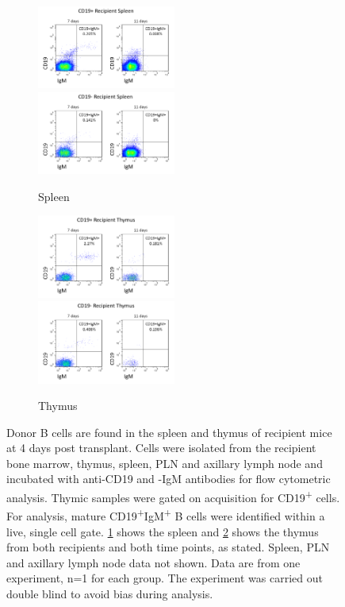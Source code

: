 \begin{figure}
	\begin{subfigure}{\textwidth}
	\caption{Spleen}
	\includegraphics[width=0.5\textwidth]{Figures/CD19posrecipspleen.png}
	\includegraphics[width=0.5\textwidth]{Figures/CD19negrecipspleen.png}
	\label{subfig:transferspleen}
	\end{subfigure}
	\begin{subfigure}{\textwidth}
	\caption{Thymus}
	\includegraphics[width=0.5\textwidth]{Figures/CD19posrecipthy.png}
	\includegraphics[width=0.5\textwidth]{Figures/CD19negrecipthy.png}
	\label{subfig:transferthymus}
	\end{subfigure}
\caption[Donor B cells are found in the spleen and thymus of recipient mice at 4 days post transplant]{Donor B cells are found in the spleen and thymus of recipient mice at 4 days post transplant.
Cells were isolated from the recipient bone marrow, thymus, spleen, PLN and axillary lymph node and incubated with anti-CD19 and -IgM antibodies for flow cytometric analysis.
Thymic samples were gated on acquisition for CD19\textsuperscript{+} cells.
For analysis, mature CD19\textsuperscript{+}IgM\textsuperscript{+} B cells were identified within a live, single cell gate.
\ref{subfig:transferspleen} shows the spleen and \ref{subfig:transferthymus} shows the thymus from both recipients and both time points, as stated. Spleen, PLN and axillary lymph node data not shown.
Data are from one experiment, n=1 for each group.
The experiment was carried out double blind to avoid bias during analysis.}
\label{fig:Transfer}
\end{figure}

